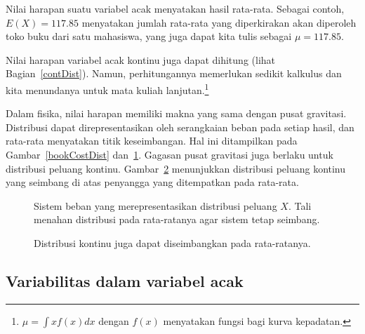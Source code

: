 
Nilai harapan suatu variabel acak menyatakan hasil rata-rata. Sebagai contoh, $E(X)=117.85$ menyatakan jumlah rata-rata yang diperkirakan akan diperoleh toko buku dari satu mahasiswa, yang juga dapat kita tulis sebagai $\mu=117.85$.

Nilai harapan variabel acak kontinu juga dapat dihitung (lihat Bagian~\ref{contDist}). Namun, perhitungannya memerlukan sedikit kalkulus dan kita menundanya untuk mata kuliah lanjutan.\footnote{$\mu = \int xf(x)dx$ dengan $f(x)$ menyatakan fungsi bagi kurva kepadatan.}

Dalam fisika, nilai harapan memiliki makna yang sama dengan pusat gravitasi. Distribusi dapat direpresentasikan oleh serangkaian beban pada setiap hasil, dan rata-rata menyatakan titik keseimbangan. Hal ini ditampilkan pada Gambar~\ref{bookCostDist} dan~\ref{bookWts}. Gagasan pusat gravitasi juga berlaku untuk distribusi peluang kontinu. Gambar~\ref{contBalance} menunjukkan distribusi peluang kontinu yang seimbang di atas penyangga yang ditempatkan pada rata-rata.

\begin{figure}
\centering
{}
\caption{Sistem beban yang merepresentasikan distribusi peluang $X$. Tali menahan distribusi pada rata-ratanya agar sistem tetap seimbang.}
\label{bookWts}
\end{figure}

\begin{figure}
\centering
{}
\caption{Distribusi kontinu juga dapat diseimbangkan pada rata-ratanya.}
\label{contBalance}
\end{figure}



\D{\newpage}

\subsection{Variabilitas dalam variabel acak}

